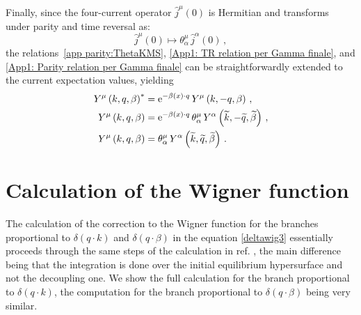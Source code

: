 \documentclass[prd,superscriptaddress,nofootinbib,notitlepage]{revtex4-1}
\newcommand{\e}{{\rm e}}
\begin{document}
Finally, since the four-current operator $\widehat{j}^\mu(0)$ is Hermitian and transforms under parity and time 
reversal as:
%
\begin{equation*}
    \widehat{j}^\mu(0) \mapsto \theta^\mu_{\alpha}\,\widehat{j}^\alpha(0)\, ,
\end{equation*}
%
the relations~\eqref{app parity:ThetaKMS}, \eqref{App1: TR relation per Gamma finale}, and \eqref{App1: Parity relation per Gamma finale} can be straightforwardly extended to the current expectation values, yielding
%
\begin{subequations}\label{app: relations Upsilon*}
    \begin{align}
        Y^\mu\left(k,q,\beta\right)^*
        &= \e^{-\beta(x)\cdot q}\,
        Y^\mu\left(k,-q,\beta\right)\, , \\
        Y^\mu\left(k,q,\beta\right)
        &= \e^{-\beta(x)\cdot q}\,
        \theta^\mu_{\alpha}\,
        Y^\alpha\left(\widetilde{k},-\widetilde{q},\widetilde{\beta}\right)\, , \\
        Y^\mu\left(k,q,\beta\right)
        &= \theta^\mu_{\alpha}\,
        Y^\alpha\left(\widetilde{k},\widetilde{q},\widetilde{\beta}\right)\, .
    \end{align}
\end{subequations}
%

\section{Calculation of the Wigner function}
\label{SECTION: Wigner computation}

The calculation of the correction to the Wigner function for the branches proportional to $\delta(q\cdot k)$ and $\delta(q \cdot \beta)$ 
in the equation \eqref{deltawig3} essentially proceeds through the same steps of the calculation in ref. \cite{Sheng:2025cjk}, the 
main difference being that the integration is done over the initial equilibrium hypersurface and not the decoupling one. We show the 
full calculation for the branch proportional to $\delta(q\cdot k)$, the computation for the branch proportional to $\delta(q\cdot\beta)$ 
being very similar.
\end{document}

